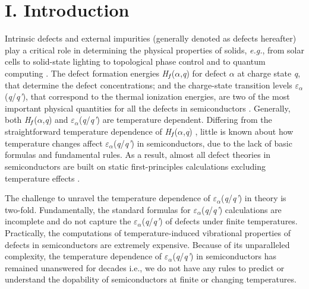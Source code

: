 \documentclass[onecolumn,preprint,superscriptaddress]{revtex4-1}
\begin{document}
\maketitle

\section*{I. Introduction}
Intrinsic defects and external impurities (generally denoted as defects hereafter) play a critical role in determining the physical properties of solids, \emph{e.g.}, from solar cells \cite{1,2,3} to solid-state lighting \cite{4,5} to topological phase control \cite{6,7,8} and to quantum computing \cite{9,10,11}. The defect formation energies \emph{H}$_{\emph{f}}$(\emph{$\alpha$},\emph{q}) for defect $\alpha$ at charge state \emph{q}, that determine the defect concentrations; and the charge-state transition levels $\varepsilon$$_{\alpha}$(\emph{q}/\emph{q'}), that correspond to the thermal ionization energies, are two of the most important physical quantities for all the defects in semiconductors \cite{12,13,50}. Generally, both \emph{H}$_{\emph{f}}$(\emph{$\alpha$},\emph{q}) and $\varepsilon$$_{\alpha}$(\emph{q}/\emph{q'}) are temperature dependent. Differing from the straightforward temperature dependence of \emph{H}$_{\emph{f}}$(\emph{$\alpha$},\emph{q}) \cite{12,13,14,17,18}, little is known about how temperature changes affect $\varepsilon$$_{\alpha}$(\emph{q}/\emph{q'}) in semiconductors, due to the lack of basic formulas and fundamental rules. As a result, almost all defect theories in semiconductors are built on static first-principles calculations excluding temperature effects \cite{12,13,50}.

The challenge to unravel the temperature dependence of $\varepsilon$$_{\alpha}$(\emph{q}/\emph{q'}) in theory is two-fold. Fundamentally, the standard formulas for $\varepsilon$$_{\alpha}$(\emph{q}/\emph{q'}) calculations are incomplete and do not capture the $\varepsilon$$_{\alpha}$(\emph{q}/\emph{q'}) of defects under finite temperatures. Practically, the computations of temperature-induced vibrational properties of defects in semiconductors are extremely expensive. Because of its unparalleled complexity, the temperature dependence of $\varepsilon$$_{\alpha}$(\emph{q}/\emph{q'}) in semiconductors has remained unanswered for decades i.e., we do not have any rules to predict or understand the dopability of semiconductors at finite or changing temperatures.
\end{document}
